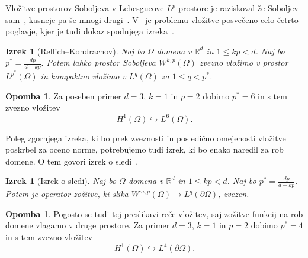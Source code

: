 \documentclass[12pt,a4paper,twoside]{article}
\theoremstyle{definition} %
\newtheorem{opomba}[definicija]{Opomba}
\theoremstyle{plain} %
\newtheorem{izrek}[definicija]{Izrek}
\numberwithin{equation}{section}
\newcommand{\R}{\mathbb R}
\begin{document}
Vložitve prostorov Soboljeva v Lebesgueove $L^p$ prostore je raziskoval že Soboljev
sam~\cite{soboleff1938theoreme}, kasneje pa še mnogi
drugi~\cite{brezis1980note,edmunds2000sobolev,evans1987sobolev}. V~\cite{adams2003sobolev} je
problemu vložitve posvečeno celo četrto poglavje, kjer je tudi dokaz spodnjega izreka~\cite[str.~85,
izrek 4.12]{adams2003sobolev}.
\begin{izrek}[Rellich--Kondrachov]
  \label{izr:vlozitev-sobolj}
  Naj bo $\Omega$ domena v $\R^d$ in $1 \leq kp < d$. Naj bo $p^\ast = \frac{dp}{d-kp}.$ Potem lahko
  prostor Soboljeva $W^{k,p}(\Omega)$ zvezno vložimo v prostor $L^{p^\ast}(\Omega)$ in kompaktno
  vložimo v $L^q(\Omega)$ za $1 \leq q < p^\ast$.
\end{izrek}
\begin{opomba}
  Za poseben primer $d=3$, $k=1$ in $p=2$ dobimo $p^\ast = 6$ in s tem zvezno vložitev
  \begin{equation}
    \label{eq:vloz-int}
    H^1(\Omega) \hookrightarrow L^6(\Omega).
  \end{equation}
\end{opomba}
Poleg zgornjega izreka, ki bo prek zveznosti in posledično omejenosti vložitve poskrbel za oceno
norme, potrebujemo tudi izrek, ki bo enako naredil za rob domene. O tem govori izrek o
sledi~\cite[str.\ 164, izrek 5.36]{adams2003sobolev}.
\begin{izrek}[Izrek o sledi]
  \label{izr:soboljev-sled}
  Naj bo $\Omega$ domena v $\R^d$ in $1 \leq kp < d$. Naj bo $p^\ast = \frac{dp}{d-kp}.$  Potem
  je operator zožitve, ki slika $W^{m,p}(\Omega) \to L^q(\partial \Omega)$, zvezen.
\end{izrek}
\begin{opomba}
  Pogosto se tudi tej preslikavi reče vložitev, saj zožitve funkcij na rob domene vlagamo v druge
  prostore. Za primer $d=3$, $k=1$ in $p=2$ dobimo $p^\ast = 4$ in s tem zvezno vložitev
  \begin{equation}
    \label{eq:vloz-rob}
    H^1(\Omega) \hookrightarrow L^4(\partial\Omega).
  \end{equation}
\end{opomba}
\end{document}
